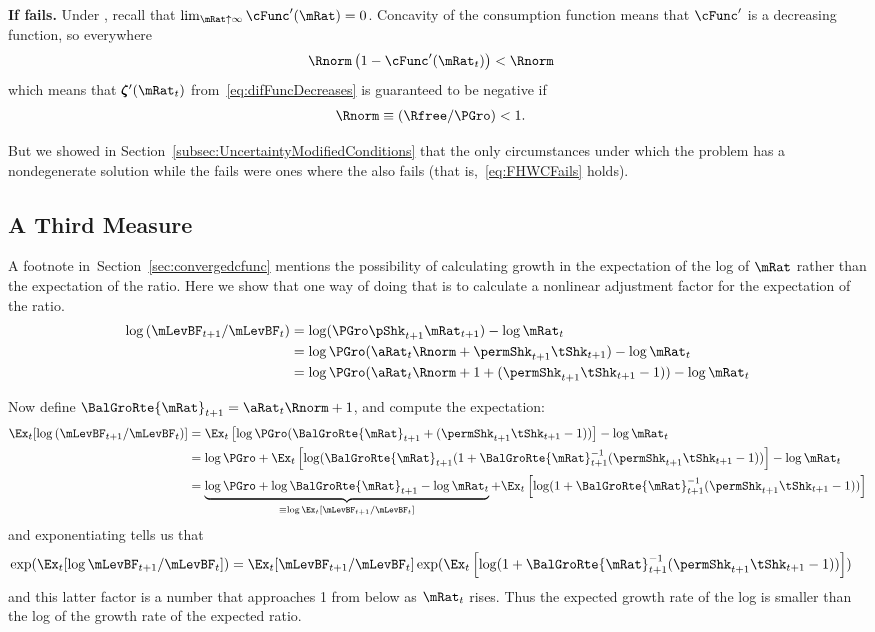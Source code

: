 \documentclass[\econtexRoot/BufferStockTheory]{subfiles}
\begin{document}
\textbf{If {\RIC} fails.}
Under \cncl{\RIC}, recall that $\lim_{\mRat \uparrow \infty} \cFunc^{\prime}(\mRat) = 0$.  Concavity of the consumption function means that $\cFunc^{\prime}$ is a decreasing function, so everywhere 
\begin{align*}
  \Rnorm\left(1-\cFunc^{\prime}({\mRat}_t)\right) & < \Rnorm
\end{align*}
which means that $\difFunc^{\prime}(\mRat_{t})$ from~\eqref{eq:difFuncDecreases} is guaranteed to be negative if
\begin{align}
  \Rnorm \equiv (\Rfree/\PGro) & < 1  \label{eq:FHWCFails}.
\end{align}

But we showed in Section~\ref{subsec:UncertaintyModifiedConditions} that the only circumstances under which the problem has a nondegenerate solution while the {\RIC} fails were ones where the {\FHWC} also fails (that is,~\eqref{eq:FHWCFails} holds).

\subsection{A Third Measure}

A footnote in~Section~\ref{sec:convergedcfunc} mentions the possibility of calculating growth in the expectation of the log of $\mRat$ rather than the expectation of the ratio.  Here we show that one way of doing that is to calculate a nonlinear adjustment factor for the expectation of the ratio.
\begin{align*}
\log \left(\mLevBF_{t+1}/\mLevBF_{t}\right) & = \log (\PGro \pShk_{t+1} \mRat_{t+1})- \log \mRat_{t} 
\\ & = \log \PGro (\aRat_{t}\Rnorm+\permShk_{t+1}\tShk_{t+1})- \log \mRat_{t} 
\\ & = \log \PGro (\aRat_{t}\Rnorm+1+(\permShk_{t+1}\tShk_{t+1}-1))- \log \mRat_{t}
\end{align*}

Now define $\BalGroRte{\mRat}_{t+1}=\aRat_{t}\Rnorm+1$, and compute the expectation:
\begin{align*}
  \Ex_{t}[\log \left(\mLevBF_{t+1}/\mLevBF_{t}\right)]
   & = \Ex_{t}\left[\log \PGro (\BalGroRte{\mRat}_{t+1}+(\permShk_{t+1}\tShk_{t+1}-1))\right]- \log \mRat_{t} 
\\ & = \log \PGro + \Ex_{t}\left[\log (\BalGroRte{\mRat}_{t+1}(1+\BalGroRte{\mRat}_{t+1}^{-1}(\permShk_{t+1}\tShk_{t+1}-1))\right]- \log \mRat_{t} 
\\ & = \underbrace{\log \PGro + \log \BalGroRte{\mRat}_{t+1} - \log \mRat_{t}}_{\equiv \log \Ex_{t}[\mLevBF_{t+1}/\mLevBF_{t}]} + \Ex_{t}\left[ \log (1+\BalGroRte{\mRat}_{t+1}^{-1}(\permShk_{t+1}\tShk_{t+1}-1))\right]
\end{align*}
and exponentiating tells us that
\begin{align}
  \exp(\Ex_{t}[\log \mLevBF_{t+1}/\mLevBF_{t}]) & = \Ex_{t}[\mLevBF_{t+1}/\mLevBF_{t}]\exp( \Ex_{t}\left[ \log (1+\BalGroRte{\mRat}_{t+1}^{-1}(\permShk_{t+1}\tShk_{t+1}-1))\right])
\end{align}
and this latter factor is a number that approaches 1 from below as $\mRat_{t}$ rises.  Thus the expected growth rate of the log is smaller than the log of the growth rate of the expected ratio.
\end{document}

